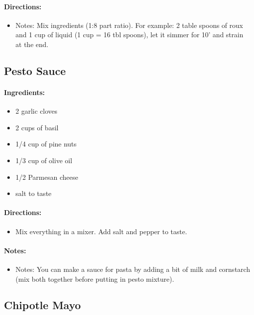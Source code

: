 \documentclass{article}
\begin{document}
\paragraph{Directions:}
\begin{itemize}
    \item Notes: Mix ingredients (1:8 part ratio). For example: 2 table spoons of roux and 1 cup of liquid (1 cup = 16 tbl spoons), let it simmer for 10' and strain at the end.
\end{itemize}

\subsection{Pesto Sauce}

\paragraph{Ingredients:}
\begin{itemize}
    \item 2 garlic cloves
    \item 2 cups of basil
    \item 1/4 cup of pine nuts
    \item 1/3 cup of olive oil
    \item 1/2 Parmesan cheese
    \item salt to taste
\end{itemize}

\paragraph{Directions:}
\begin{itemize}
    \item Mix everything in a mixer. Add salt and pepper to taste.
\end{itemize}

\paragraph{Notes:}
\begin{itemize}
    \item Notes: You can make a sauce for pasta by adding a bit of milk and cornstarch (mix both together before putting in pesto mixture).
\end{itemize}

\subsection{Chipotle Mayo}
\end{document}

